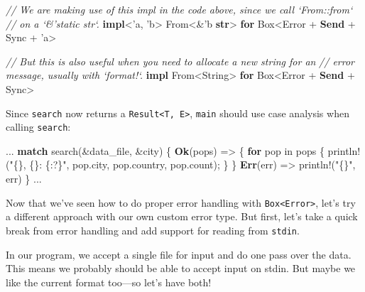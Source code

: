 \documentclass[a4paper,]{book}
\newenvironment{Shaded}{\begin{snugshade}}{\end{snugshade}}
\newcommand{\KeywordTok}[1]{\textcolor[rgb]{0.13,0.29,0.53}{\textbf{{#1}}}}
\newcommand{\StringTok}[1]{\textcolor[rgb]{0.31,0.60,0.02}{{#1}}}
\newcommand{\CommentTok}[1]{\textcolor[rgb]{0.56,0.35,0.01}{\textit{{#1}}}}
\newcommand{\OtherTok}[1]{\textcolor[rgb]{0.56,0.35,0.01}{{#1}}}
\newcommand{\NormalTok}[1]{{#1}}
\begin{document}
\begin{Shaded}
\begin{Highlighting}[]
\CommentTok{// We are making use of this impl in the code above, since we call `From::from`}
\CommentTok{// on a `&'static str`.}
\KeywordTok{impl}\NormalTok{<}\OtherTok{'a}\NormalTok{, }\OtherTok{'b}\NormalTok{> From<&}\OtherTok{'b} \KeywordTok{str}\NormalTok{> }\KeywordTok{for} \NormalTok{Box<Error + }\KeywordTok{Send} \NormalTok{+ Sync + }\OtherTok{'a}\NormalTok{>}

\CommentTok{// But this is also useful when you need to allocate a new string for an}
\CommentTok{// error message, usually with `format!`.}
\KeywordTok{impl} \NormalTok{From<String> }\KeywordTok{for} \NormalTok{Box<Error + }\KeywordTok{Send} \NormalTok{+ Sync>}
\end{Highlighting}
\end{Shaded}

Since \texttt{search} now returns a
\texttt{Result\textless{}T,\ E\textgreater{}}, \texttt{main} should use
case analysis when calling \texttt{search}:

\begin{Shaded}
\begin{Highlighting}[]
\NormalTok{...}
\KeywordTok{match} \NormalTok{search(&data_file, &city) \{}
    \KeywordTok{Ok}\NormalTok{(pops) => \{}
        \KeywordTok{for} \NormalTok{pop in pops \{}
            \OtherTok{println!}\NormalTok{(}\StringTok{"\{\}, \{\}: \{:?\}"}\NormalTok{, pop.city, pop.country, pop.count);}
        \NormalTok{\}}
    \NormalTok{\}}
    \KeywordTok{Err}\NormalTok{(err) => }\OtherTok{println!}\NormalTok{(}\StringTok{"\{\}"}\NormalTok{, err)}
\NormalTok{\}}
\NormalTok{...}
\end{Highlighting}
\end{Shaded}

Now that we've seen how to do proper error handling with
\texttt{Box\textless{}Error\textgreater{}}, let's try a different
approach with our own custom error type. But first, let's take a quick
break from error handling and add support for reading from
\texttt{stdin}.


In our program, we accept a single file for input and do one pass over
the data. This means we probably should be able to accept input on
stdin. But maybe we like the current format too---so let's have both!
\end{document}
